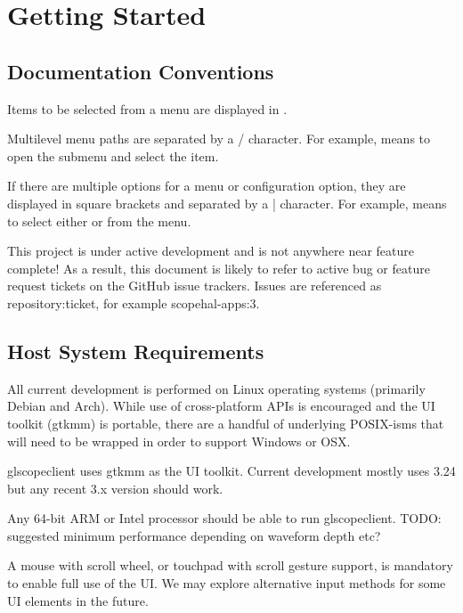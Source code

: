 \section{Getting Started}

\subsection{Documentation Conventions}

Items to be selected from a menu are displayed in .

Multilevel menu paths are separated by a / character. For example,  means to open the
 submenu and select the  item.

If there are multiple options for a menu or configuration option, they are displayed in square brackets and separated
by a | character. For example,  means to select either
 or  from the 
menu.

This project is under active development and is not anywhere near feature complete! As a result, this document is
likely to refer to active bug or feature request tickets on the GitHub issue trackers. Issues are referenced as
repository:ticket, for example scopehal-apps:3.

\subsection{Host System Requirements}

All current development is performed on Linux operating systems (primarily Debian and Arch). While use of
cross-platform APIs is encouraged and the UI toolkit (gtkmm) is portable, there are a handful of underlying POSIX-isms
that will need to be wrapped in order to support Windows or OSX.

glscopeclient uses gtkmm as the UI toolkit. Current development mostly uses 3.24 but any recent 3.x version should work.

Any 64-bit ARM or Intel processor should be able to run glscopeclient. TODO: suggested minimum performance depending on
waveform depth etc?

A mouse with scroll wheel, or touchpad with scroll gesture support, is mandatory to enable full use of the UI. We may
explore alternative input methods for some UI elements in the future.

